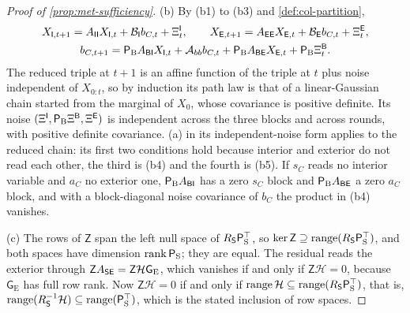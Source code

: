 \begin{proof}[Proof of \cref{prop:met-sufficiency}]
(b) By (b1) to (b3) and \cref{def:col-partition},
\[
\begin{gathered}
X_{\mathsf{I},t+1}=A_{\mathsf{I}\mathsf{I}}X_{\mathsf{I},t}+\mathcal B_{\mathsf{I}}b_{C,t}+\Xi^{\mathsf{I}}_t,\qquad X_{\mathsf{E},t+1}=A_{\mathsf{E}\mathsf{E}}X_{\mathsf{E},t}+\mathcal B_{\mathsf{E}}b_{C,t}+\Xi^{\mathsf{E}}_t,\\
b_{C,t+1}=\mathsf P_{\mathrm B}A_{\mathsf{B}\mathsf{I}}X_{\mathsf{I},t}+\mathcal A_{bb}b_{C,t}+\mathsf P_{\mathrm B}A_{\mathsf{B}\mathsf{E}}X_{\mathsf{E},t}+\mathsf P_{\mathrm B}\Xi^{\mathsf{B}}_t.
\end{gathered}
\]
The reduced triple at $t+1$ is an affine function of the triple at $t$ plus noise independent of $X_{0:t}$, so by induction its path law is that of a linear-Gaussian chain started from the marginal of $X_0$, whose covariance is positive definite. Its noise $(\Xi^{\mathsf{I}},\mathsf P_{\mathrm B}\Xi^{\mathsf{B}},\Xi^{\mathsf{E}})$ is independent across the three blocks and across rounds, with positive definite covariance. (a) in its independent-noise form applies to the reduced chain: its first two conditions hold because interior and exterior do not read each other, the third is (b4) and the fourth is (b5). If $s_C$ reads no interior variable and $a_C$ no exterior one, $\mathsf P_{\mathrm B}A_{\mathsf{B}\mathsf{I}}$ has a zero $s_C$ block and $\mathsf P_{\mathrm B}A_{\mathsf{B}\mathsf{E}}$ a zero $a_C$ block, and with a block-diagonal noise covariance of $b_C$ the product in (b4) vanishes.

(c) The rows of $\mathsf Z$ span the left null space of $R_{\mathsf{S}}\mathsf P_{\mathrm S}^\top$, so $\ker\mathsf Z\supseteq\operatorname{range}(R_{\mathsf{S}}\mathsf P_{\mathrm S}^\top)$, and both spaces have dimension $\operatorname{rank}\mathsf P_{\mathrm S}$; they are equal. The residual reads the exterior through $\mathsf ZA_{\mathsf{S}\mathsf{E}}=\mathsf Z\mathcal H\mathsf G_{\mathrm E}$, which vanishes if and only if $\mathsf Z\mathcal H=0$, because $\mathsf G_{\mathrm E}$ has full row rank. Now $\mathsf Z\mathcal H=0$ if and only if $\operatorname{range}\mathcal H\subseteq\operatorname{range}(R_{\mathsf{S}}\mathsf P_{\mathrm S}^\top)$, that is, $\operatorname{range}(R_{\mathsf{S}}^{-1}\mathcal H)\subseteq\operatorname{range}(\mathsf P_{\mathrm S}^\top)$, which is the stated inclusion of row spaces.
\end{proof}


